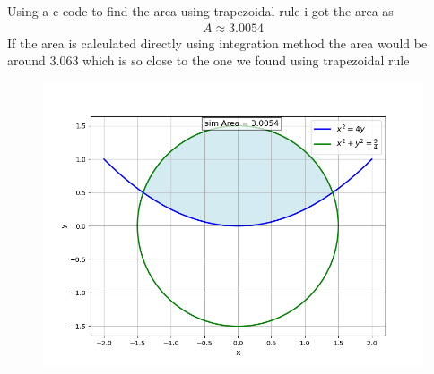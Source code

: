 \documentclass[journal]{IEEEtran}
\numberwithin{equation}{enumi}
\numberwithin{figure}{enumi}
\begin{document}
Using a c code to find the area using trapezoidal rule i got the area as
\begin{align}
    A \approx 3.0054
\end{align}
If the area is calculated directly using integration method the area would be around 3.063 which  is so close to the one we found using trapezoidal rule 
\begin{figure}
	\centering
	\includegraphics[width=\columnwidth]{figs/Figure_1.png}
	\label{stemplot}
\end{figure}	
\end{document}
